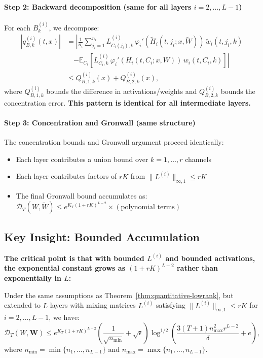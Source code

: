 \paragraph*{Step 2: Backward decomposition (same for all layers $i = 2, \ldots, L-1$)}
For each $B_k^{(i)}$, we decompose:
\begin{align*}
|q_{B,k}^{(i)}(t, x)| &= \left|\frac{1}{n_i}\sum_{j_i=1}^{n_i} L^{(i)}_{C_i(j_i),k}\,\varphi_i'(\tilde{H}_i(t, j_i; x, \tilde{W}))\,\tilde{w}_i(t, j_i, k)\right.\\
&\quad\left. - \mathbb{E}_{C_i}[L^{(i)}_{C_i,k}\,\varphi_i'(H_i(t, C_i; x, W))\,w_i(t, C_i, k)]\right|\\
&\le Q_{B,1,k}^{(i)}(x) + Q_{B,2,k}^{(i)}(x),
\end{align*}
where $Q_{B,1,k}^{(i)}$ bounds the difference in activations/weights and $Q_{B,2,k}^{(i)}$ bounds the concentration error. \textbf{This pattern is identical for all intermediate layers.}

\paragraph*{Step 3: Concentration and Gronwall (same structure)}
The concentration bounds and Gronwall argument proceed identically:
\begin{itemize}
\item Each layer contributes a union bound over $k = 1, \ldots, r$ channels
\item Each layer contributes factors of $rK$ from $\|L^{(i)}\|_{\infty,1} \le rK$
\item The final Gronwall bound accumulates as: $\mathscr{D}_T(W, \tilde{W}) \le e^{K_T(1+rK)^{L-2}} \times (\text{polynomial terms})$
\end{itemize}

\subsection{Key Insight: Bounded Accumulation}

\textbf{The critical point is that with bounded $L^{(i)}$ and bounded activations, the exponential constant grows as $(1+rK)^{L-2}$ rather than exponentially in $L$:}

\begin{theorem}
Under the same assumptions as Theorem~\ref{thm:quantitative-lowrank}, but extended to $L$ layers with mixing matrices $L^{(i)}$ satisfying $\|L^{(i)}\|_{\infty,1} \le rK$ for $i = 2, \ldots, L-1$, we have:
\[
\mathscr{D}_T(W, \mathbf{W}) \le e^{K_T(1+rK)^{L-2}}\left(\frac{1}{\sqrt{n_{\min}}} + \sqrt{\epsilon}\right)\log^{1/2}\left(\frac{3(T+1)n_{\max}^2r^{L-2}}{\delta} + e\right),
\]
where $n_{\min} = \min\{n_1, \ldots, n_{L-1}\}$ and $n_{\max} = \max\{n_1, \ldots, n_{L-1}\}$.
\end{theorem}

